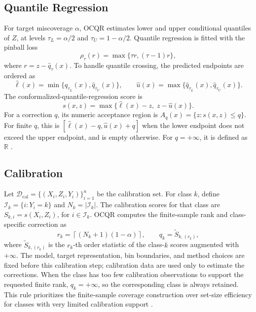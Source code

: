 \documentclass[12pt]{report}
\begin{document}
\subsection{Quantile Regression}

For target miscoverage \(\alpha\), OCQR estimates lower and upper conditional quantiles of \(Z\), at levels \(\tau_L=\alpha/2\) and \(\tau_U=1-\alpha/2\). Quantile regression is fitted with the pinball loss
\begin{equation}
\rho_{\tau}(r)=\max\{\tau r,(\tau-1)r\},
\label{eq:ocqr-pinball-loss}
\end{equation}
where \(r=z-\widehat q_{\tau}(x)\). To handle quantile crossing, the predicted endpoints are ordered as
\begin{equation}
\widehat\ell(x)=\min\{\widehat q_{\tau_L}(x),\widehat q_{\tau_U}(x)\},
\qquad
\widehat u(x)=\max\{\widehat q_{\tau_L}(x),\widehat q_{\tau_U}(x)\}.
\label{eq:ocqr-ordered-endpoints}
\end{equation}
The conformalized-quantile-regression score is
\begin{equation}
s(x,z)=\max\{\widehat\ell(x)-z,\;z-\widehat u(x)\}.
\label{eq:ocqr-score}
\end{equation}
For a correction \(q\), its numeric acceptance region is \(A_q(x)=\{z:s(x,z)\leq q\}\). For finite \(q\), this is \([\widehat\ell(x)-q,\widehat u(x)+q]\) when the lower endpoint does not exceed the upper endpoint, and is empty otherwise. For \(q=+\infty\), it is defined as \(\mathbb{R}\) \citep{romano2019cqr,hong2026ocqr}.

\subsection{Calibration}

Let \(\mathcal{D}_{\mathrm{cal}}=\{(X_i,Z_i,Y_i)\}_{i=1}^n\) be the calibration set. For class \(k\), define \(\mathcal{I}_k=\{i:Y_i=k\}\) and \(N_k=|\mathcal{I}_k|\). The calibration scores for that class are \(S_{k,i}=s(X_i,Z_i)\), for \(i\in\mathcal{I}_k\). OCQR computes the finite-sample rank and class-specific correction as
\begin{equation}
r_k=\left\lceil(N_k+1)(1-\alpha)\right\rceil,
\qquad
q_k=\widetilde S_{k,(r_k)},
\label{eq:ocqr-class-correction}
\end{equation}
where \(\widetilde S_{k,(r_k)}\) is the \(r_k\)-th order statistic of the class-\(k\) scores augmented with \(+\infty\). The model, target representation, bin boundaries, and method choices are fixed before this calibration step; calibration data are used only to estimate the corrections. When the class has too few calibration observations to support the requested finite rank, \(q_k=+\infty\), so the corresponding class is always retained. This rule prioritizes the finite-sample coverage construction over set-size efficiency for classes with very limited calibration support \citep{hong2026ocqr}.
\end{document}
